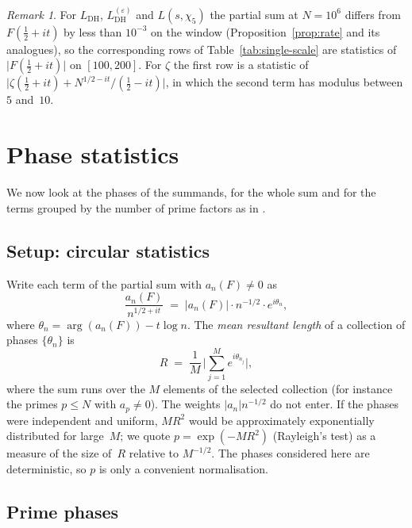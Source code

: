 \documentclass[11pt]{amsart}
\theoremstyle{definition}
\theoremstyle{remark}
\newtheorem{remark}[theorem]{Remark}
\renewcommand{\DH}{\mathrm{DH}}
\newcommand{\abs}[1]{\lvert #1 \rvert}
\begin{document}
\begin{remark}\label{rem:single-scale}
For $L_{\DH}$, $L_{\DH}^{(\varepsilon)}$ and $L(s,\chi_5)$ the partial sum
at $N=10^6$ differs from $F(\tfrac12+it)$ by less than $10^{-3}$ on the
window (Proposition~\ref{prop:rate} and its analogues), so the
corresponding rows of Table~\ref{tab:single-scale} are statistics of
$\abs{F(\tfrac12+it)}$ on $[100,200]$.  For $\zeta$ the first row is a
statistic of
$\abs{\zeta(\tfrac12+it)+N^{1/2-it}/(\tfrac12-it)}$, in which the second
term has modulus between $5$ and~$10$.
\end{remark}

\section{Phase statistics}\label{sec:phase}

We now look at the phases of the summands, for the whole sum and for the
terms grouped by the number of prime factors as in \cite{TrejoOmega}.

\subsection{Setup: circular statistics}

Write each term of the partial sum with $a_n(F)\ne0$ as
\begin{equation}\label{eq:term-phase}
  \frac{a_n(F)}{n^{1/2+it}}
  \;=\; \abs{a_n(F)} \cdot n^{-1/2} \cdot e^{i\theta_n},
\end{equation}
where $\theta_n = \arg(a_n(F)) - t\log n$.  The \emph{mean resultant
length} of a collection of phases $\{\theta_n\}$ is
\begin{equation}\label{eq:R-stat}
  R \;=\; \frac{1}{M}\,\biggl\lvert
    \sum_{j=1}^{M} e^{i\theta_{n_j}} \biggr\rvert,
\end{equation}
where the sum runs over the $M$ elements of the selected collection
(for instance the primes $p\le N$ with $a_p\ne0$).  The weights
$\abs{a_n}n^{-1/2}$ do not enter.  If the phases were independent and
uniform, $MR^2$ would be approximately exponentially distributed for
large~$M$; we quote $p=\exp(-MR^2)$ (Rayleigh's test) as a measure of the
size of~$R$ relative to $M^{-1/2}$.  The phases considered here are
deterministic, so $p$ is only a convenient normalisation.

\subsection{Prime phases}\label{ssec:prime-phases}
\end{document}

